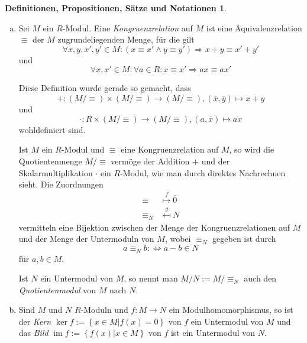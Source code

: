 \documentclass[
twoside=semi,
fontsize=12,
DIV=12, 
cleardoublepage=current,
leqno,
headings=optiontoheadandtoc, 
toc=idx
]{scrbook}
\newcommand{\set}[1]{\left\{ #1 \right\}}
\DeclareMathOperator{\im}{im}
\theoremstyle{definition}
\newtheorem{def-prop-satz-not}[definition]{Definitionen, Propositionen, S\"atze und Notationen}
\begin{document}
\begin{def-prop-satz-not}
\begin{enumerate}[(a)]
			Ein Modulhomomorphismus $f:M\to N$ hei\ss t Einbettung/Monomorphismus (Epimorphismus, Isomorphismus), wenn $f$ injektiv (surjektiv, bijektiv) ist. 
			
			Ein Modulhomomorphismus $f:M \to M$ hei\ss t \emph{(Modul-)Endomorphismus} von $M$. Ein Endomorphismus, der ein Isomorphismus ist, hei\ss t \emph{Automorphismus}. Es hei\ss en $M$ und $N$ \emph{isomorph}, in Zeichen $M \cong N$, wenn es einen Isomorphismus $M \to N$ gibt.
			
			Hintereinanderschaltungen von Modulhomomorphismen sind wieder Modulhomomorphismen. Umkehrabbildungen von Modulisomorphismen sind wieder Modulisomorphismen.
			
			\item Sei $M$ ein $R$-Modul. Eine \emph{Kongruenzrelation} auf $M$ ist eine \"Aquivalenzrelation $\equiv$ der $M$ zugrundeliegenden Menge, f\"ur die gilt
			\[\forall x, y, x', y' \in M: (x \equiv x' \land y \equiv y') \Rightarrow x + y \equiv x' + y'\]
			und
			\[\forall x, x' \in M: \forall a \in R: x \equiv x' \Rightarrow ax \equiv ax'\]
			
			Diese Definition wurde gerade so gemacht, dass 
			\[+:( M/\equiv) \times (M/\equiv) \to (M/\equiv), (\overline{x}, \overline{y}) \mapsto \overline{x + y}\]
			und
			\[\cdot: R \times (M/\equiv) \to (M/\equiv), (a, \overline{x}) \mapsto \overline{ax}\]
			wohldefiniert sind.
			
			Ist $M$ ein $R$-Modul und $\equiv$ eine Kongruenzrelation auf $M$, so wird die Quotientenmenge $M/\equiv$ verm\"oge der Addition $+$ und der Skalarmultiplikation $\cdot$ ein $R$-Modul, wie man
			durch direktes Nachrechnen sieht. Die Zuordnungen
			\begin{align*}
				\equiv  &\overset{f}{\mapsto} \overline{0}\\
				\equiv_N &\overset{g}{\mapsfrom} N
			\end{align*}
			vermitteln eine Bijektion zwischen der Menge der Kongruenzrelationen auf $M$ und der Menge der Untermoduln von $M$, wobei $\equiv_N$ gegeben ist durch
			\[a \equiv_N b :\Leftrightarrow a - b \in N\]
			f\"ur $a, b \in M$.
			
			Ist $N$ ein Untermodul von $M$, so nennt man $M/N := M/\equiv_N$ auch den \emph{Quotientenmodul} von $M$ nach $N$.
			
			\item Sind $M$ und $N$ $R$-Moduln und $f:M \to N$ ein Modulhomomorphismus, so ist der \emph{Kern} $\ker f := \set{x \in M| f(x) = 0}$ von $f$ ein Untermodul von $M$ und das \emph{Bild} $\im f := \set{f(x) | x \in M}$ von $f$ ist ein Untermodul von $N$.
			

\end{enumerate}
\end{def-prop-satz-not}
\end{document}
